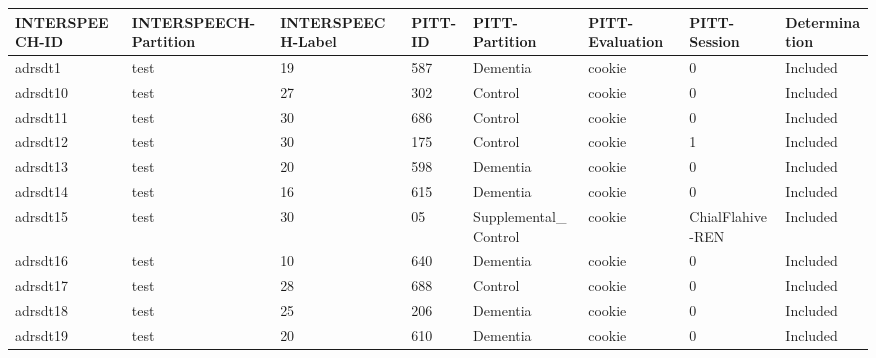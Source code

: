 \begin{center}
\tiny
\begin{longtable}{|l|l|l|l|l|l|l|l|}
\hline
INTERSPEECH-ID & INTERSPEECH-Partition & INTERSPEECH-Label & PITT-ID & PITT-Partition & PITT-Evaluation & PITT-Session & Determination \\ \hline
adrsdt1        & test                  & 19              & 587                & Dementia             & cookie          & 0                & Included      \\ \hline
adrsdt10       & test                  & 27              & 302                & Control              & cookie          & 0                & Included      \\ \hline
adrsdt11       & test                  & 30              & 686                & Control              & cookie          & 0                & Included      \\ \hline
adrsdt12       & test                  & 30              & 175                & Control              & cookie          & 1                & Included      \\ \hline
adrsdt13       & test                  & 20              & 598                & Dementia             & cookie          & 0                & Included      \\ \hline
adrsdt14       & test                  & 16              & 615                & Dementia             & cookie          & 0                & Included      \\ \hline
adrsdt15       & test                  & 30              & 05                 & Supplemental\_Control & cookie          & ChialFlahive-REN & Included      \\ \hline
adrsdt16       & test                  & 10              & 640                & Dementia             & cookie          & 0                & Included      \\ \hline
adrsdt17       & test                  & 28              & 688                & Control              & cookie          & 0                & Included      \\ \hline
adrsdt18       & test                  & 25              & 206                & Dementia             & cookie          & 0                & Included      \\ \hline
adrsdt19       & test                  & 20              & 610                & Dementia             & cookie          & 0                & Included      \\ \hline

\end{longtable}
\end{center}
